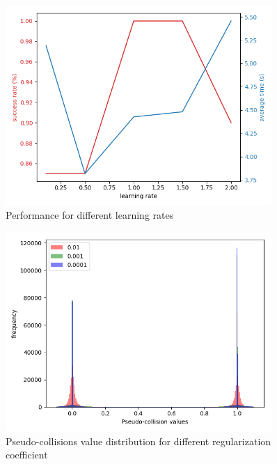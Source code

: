 \documentclass[final]{beamer}
\newlength{\sepwid}
\newlength{\onecolwid}
\newlength{\twocolwid}
\begin{document}
\begin{frame}[t]
\begin{columns}[t]
\begin{column}{\twocolwid}
\end{column} %

\begin{column}{\sepwid}\end{column} %

\begin{column}{\onecolwid} %


\begin{figure}
    \includegraphics[width=0.8\linewidth]{learning_rate}
        \caption{Performance for different learning rates} 
        \label{fig:lrate}
\end{figure}

\begin{figure}
    \includegraphics[width=0.8\linewidth]{data_distribution}
        \caption{Pseudo-collisions value distribution for different regularization coefficient} 
        \label{fig:datadist}
\end{figure}




\end{column}
\end{columns}
\end{frame}
\end{document}
